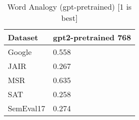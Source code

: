 \begin{table}[]
\centering
\begin{tabular}{l|l}
\hline
Dataset & gpt2-pretrained 768 \\
\hline
Google & 0.558 \\ 
JAIR & 0.267 \\ 
MSR & 0.635 \\ 
SAT & 0.258 \\ 
SemEval17 & 0.274
\end{tabular}
\caption{Word Analogy (gpt-pretrained) [1 is best]}
\label{tab:analogy-gpt-pretrained}
\end{table}
